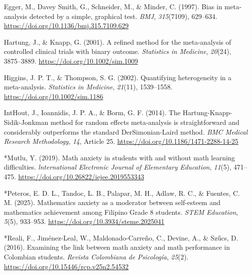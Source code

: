 \documentclass[man,a4paper,12pt,floatsintext,nolmodern,notab]{apa7}
\begin{document}
\par\noindent\hangindent=0.5in Egger, M., Davey Smith, G., Schneider, M., \& Minder, C. (1997). Bias in meta-analysis detected by a simple, graphical test. \textit{BMJ}, \textit{315}(7109), 629–634. \url{https://doi.org/10.1136/bmj.315.7109.629}\par
\par\noindent\hangindent=0.5in Hartung, J., \& Knapp, G. (2001). A refined method for the meta-analysis of controlled clinical trials with binary outcome. \textit{Statistics in Medicine}, \textit{20}(24), 3875–3889. \url{https://doi.org/10.1002/sim.1009}\par
\par\noindent\hangindent=0.5in Higgins, J. P. T., \& Thompson, S. G. (2002). Quantifying heterogeneity in a meta-analysis. \textit{Statistics in Medicine}, \textit{21}(11), 1539–1558. \url{https://doi.org/10.1002/sim.1186}\par
\par\noindent\hangindent=0.5in IntHout, J., Ioannidis, J. P. A., \& Borm, G. F. (2014). The Hartung-Knapp-Sidik-Jonkman method for random effects meta-analysis is straightforward and considerably outperforms the standard DerSimonian-Laird method. \textit{BMC Medical Research Methodology}, \textit{14}, Article 25. \url{https://doi.org/10.1186/1471-2288-14-25}\par
\par\noindent\hangindent=0.5in *Mutlu, Y. (2019). Math anxiety in students with and without math learning difficulties. \textit{lnternational Electronic Journal of Elementary Education}, \textit{11}(5), 471–475. \url{https://doi.org/10.26822/iejee.2019553343}\par
\par\noindent\hangindent=0.5in *Peteros, E. D. L., Tandoc, L. B., Palapar, M. H., Adlaw, R. C., \& Fuentes, C. M. (2025). Mathematics anxiety as a moderator between self-esteem and mathematics achievement among Filipino Grade 8 students. \textit{STEM Education}, \textit{5}(5), 933–953. \url{https://doi.org/10.3934/steme.2025041}\par
\par\noindent\hangindent=0.5in *Reali, F., Jiménez-Leal, W., Maldonado-Carreño, C., Devine, A., \& Szűcs, D. (2016). Examining the link between math anxiety and math performance in Colombian students. \textit{Revista Colombiana de Psicología}, \textit{25}(2). \url{https://doi.org/10.15446/rcp.v25n2.54532}\par
\end{document}
